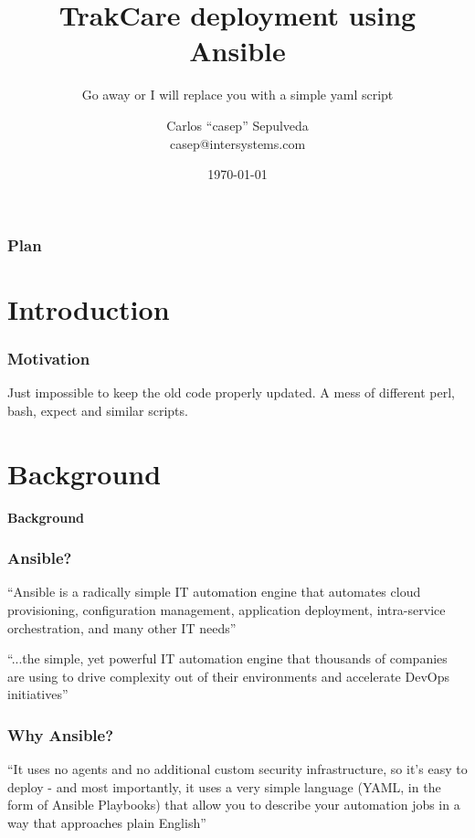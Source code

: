 \documentclass[12pt,landscape]{beamer}
\author{Carlos ``casep'' Sepulveda \\ casep@intersystems.com}
\date{\today}
\title{TrakCare deployment using Ansible}
\subtitle{Go away or I will replace you with a simple yaml script}
\begin{document}
\begin{frame}
  \titlepage
\end{frame}

\begin{frame}
  \frametitle{Plan}
  \tableofcontents
\end{frame}

\section{Introduction}
\begin{frame}[allowframebreaks]
  \frametitle{Motivation}



Just impossible to keep the old code properly updated. A mess of different perl, bash, expect and similar scripts.

\end{frame}

\section{Background}

\begin{frame}
 \textbf{Background}
\end{frame}

\begin{frame}
  \frametitle{Ansible?}
  
  ``Ansible is a radically simple IT automation engine that automates cloud provisioning, configuration management, application deployment, intra-service orchestration, and many other IT needs''\cite{ansible2}

  ``...the simple, yet powerful IT automation engine that thousands of companies are using to drive complexity out of their environments and accelerate DevOps initiatives''\cite{ansible}
          
\end{frame}

\begin{frame}
  \frametitle{Why Ansible?}
  
  ``It uses no agents and no additional custom security infrastructure, so it's easy to deploy - and most importantly, it uses a very simple language (YAML, in the form of Ansible Playbooks) that allow you to describe your automation jobs in a way that approaches plain English''\cite{ansible2}
          
\end{frame}
\end{document}
